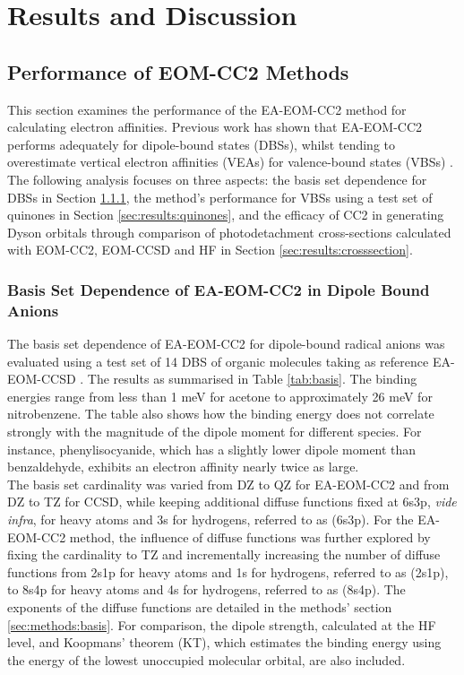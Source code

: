 \chapter{Results and Discussion}

\section{Performance of EOM-CC2 Methods}
This section examines the performance of the EA-EOM-CC2 method for calculating electron affinities. Previous work has shown that EA-EOM-CC2 performs adequately for dipole-bound states (DBSs), whilst tending to overestimate vertical electron affinities (VEAs) for valence-bound states (VBSs) \cite{paran2024performance}. The following analysis focuses on three aspects: the basis set dependence for DBSs in Section \ref{sec:results:basis}, the method's performance for VBSs using a test set of quinones in Section \ref{sec:results:quinones}, and the efficacy of CC2 in generating Dyson orbitals through comparison of photodetachment cross-sections calculated with EOM-CC2, EOM-CCSD and HF in Section \ref{sec:results:crosssection}.

\subsection{Basis Set Dependence of EA-EOM-CC2 in Dipole Bound Anions} \label{sec:results:basis}

The basis set dependence of EA-EOM-CC2 for dipole-bound radical anions was evaluated using a test set of 14 DBS of organic molecules taking as reference EA-EOM-CCSD \cite{paran2024performance}. The results as summarised in Table \ref{tab:basis}. The binding energies range from less than 1 meV for acetone to approximately 26 meV for nitrobenzene. The table also shows how the binding energy does not correlate strongly with the magnitude of the dipole moment for different species. For instance, phenylisocyanide, which has a slightly lower dipole moment than benzaldehyde, exhibits an electron affinity nearly twice as large.\\

The basis set cardinality was varied from DZ to QZ for EA-EOM-CC2 and from DZ to TZ for CCSD, while keeping additional diffuse functions fixed at 6s3p, \textit{vide infra}, for heavy atoms and 3s for hydrogens, referred to as (6s3p). For the EA-EOM-CC2 method, the influence of diffuse functions was further explored by fixing the cardinality to TZ and incrementally increasing the number of diffuse functions from 2s1p for heavy atoms and 1s for hydrogens, referred to as (2s1p), to 8s4p for heavy atoms and 4s for hydrogens, referred to as (8s4p). The exponents of the diffuse functions are detailed in the methods' section \ref{sec:methods:basis}. For comparison, the dipole strength, calculated at the HF level, and Koopmans' theorem (KT), which estimates the binding energy using the energy of the lowest unoccupied molecular orbital, are also included.\\

